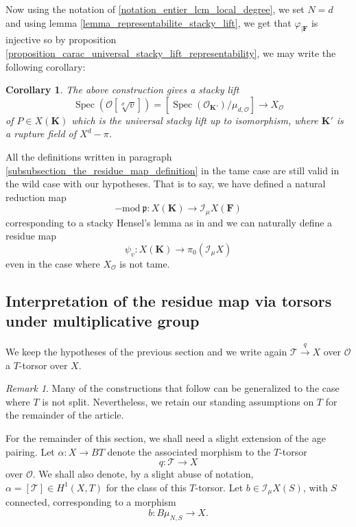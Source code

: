 \documentclass{proc-l}
\newcommand{\K}{\mathbf{K}}
\newcommand{\F}{\mathbf{F}}
\DeclareMathOperator{\Spec}{Spec}
\newcommand{\stackT}{\mathcal{T}}
\newcommand{\sheafI}{\mathcal{I}}
\newcommand{\sheafO}{\mathcal{O}}
\newcommand{\sector}{\pi_0(\sheafI_{\mu} X)}
\newtheorem{cor}[theorem]{Corollary}
\theoremstyle{definition}
\theoremstyle{remark}
\newtheorem{remark}[theorem]{Remark}
\numberwithin{equation}{section}
\begin{document}
Now using the notation of \ref{notation_entier_lcm_local_degree}, we set $N = d$ and using lemma \ref{lemma_representabilite_stacky_lift}, we get that $\varphi_{| \F}$ is injective so by proposition \ref{proposition_carac_universal_stacky_lift_representability}, we may write the following corollary:

\begin{cor}\label{corollary_description_universal_stacky_lift}
    The above construction gives a stacky lift $$\Spec(\sheafO[\sqrt[d]{v}]) = [\Spec(\sheafO_{\K'}) / \mu_{d,\sheafO}] \rightarrow X_{\sheafO} $$ of $P \in X(\K)$ which is the universal stacky lift up to isomorphism, where $\K'$ is a rupture field of $X^d - \pi$.
\end{cor}

All the definitions written in paragraph \ref{subsubsection_the_residue_map_definition} in the tame case are still valid in the wild case with our hypotheses. That is to say, we have defined a natural reduction map $$- \text{mod} \ \mathfrak{p} : X(\K) \rightarrow \sheafI_{\mu} X(\F)$$ corresponding to a stacky Hensel's lemma as in \cite[lemma 4.3]{loughran_santens_malle_conjecture} and we can naturally define a residue map $$\psi_v : X(\K) \rightarrow \sector$$ even in the case where $X_{\sheafO}$ is not tame.



\subsection{Interpretation of the residue map via torsors under multiplicative group}\label{section_interpretation_residue_map_univ_torsor}





We keep the hypotheses of the previous section and we write again $\stackT \xrightarrow{q} X$ over $\sheafO$ a $T$-torsor over $X$.

\begin{remark}
Many of the constructions that follow can be generalized to the case where $T$ is
not split. Nevertheless, we retain
our standing assumptions on $T$ for the remainder of the article.
\end{remark}


For the remainder of this section, we shall need a slight extension of the age pairing. Let
$\alpha : X \to B T$ denote the associated morphism to the $T$-torsor $$q : \stackT \rightarrow X$$over $\sheafO$. We shall also denote, by a slight abuse of notation, $\alpha = [\stackT] \in H^1(X,T)$ for the class of this $T$-torsor. Let $b \in \sheafI_{\mu} X (S)$, with $S$ connected, corresponding to a morphism
\[
b : B \mu_{N,S} \to X.
\]
\end{document}
